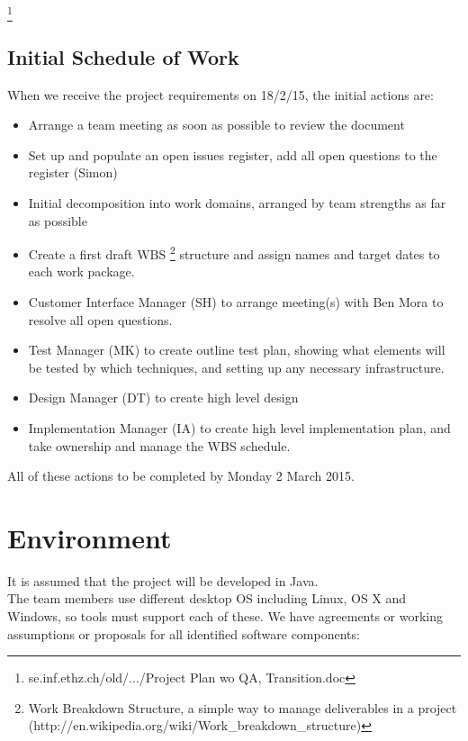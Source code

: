 \documentclass{article}
\begin{document}
\footnote{se.inf.ethz.ch/old/.../Project Plan wo QA, Transition.doc}
\subsection{Initial Schedule of Work}

When we receive the project requirements on 18/2/15, the initial actions are:

\begin{itemize}
  \item Arrange a team meeting as soon as possible to review the document
  \item Set up and populate an open issues register, add all open questions to the register (Simon)
  \item Initial decomposition into work domains, arranged by team strengths as far as possible
  \item Create a first draft WBS \footnote{Work Breakdown Structure, a simple way to manage deliverables in a project (http://en.wikipedia.org/wiki/Work\_breakdown\_structure)} structure and assign names and target dates to each work package.
  \item Customer Interface Manager (SH) to arrange meeting(s) with Ben Mora to resolve all open questions.
  \item Test Manager (MK) to create outline test plan, showing what elements will be tested by which techniques, and setting up any necessary infrastructure.
  \item Design Manager (DT) to create high level design
  \item Implementation Manager (IA) to create high level implementation plan, and take ownership and manage the WBS schedule.
\end{itemize}
All of these actions to be completed by Monday 2 March 2015.
\newpage
\section{Environment}

It is assumed that the project will be developed in Java.
\\
The team members use different desktop OS including Linux, OS X and Windows, so tools must support each of these. We have agreements or working assumptions or proposals for all identified software components:\par
\end{document}
